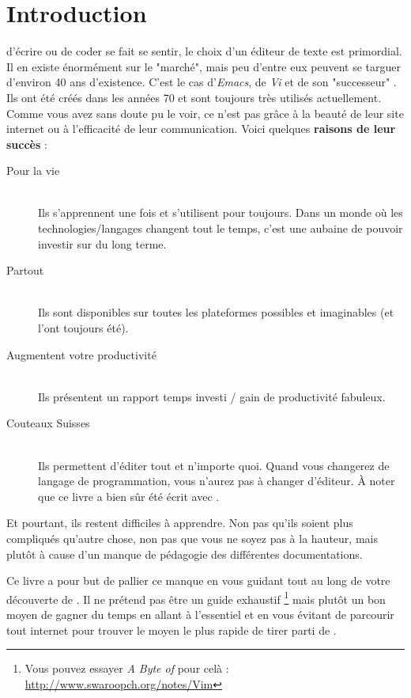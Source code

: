 \chapter*{Introduction}

 d'écrire ou de coder se fait se sentir, le choix d'un éditeur de texte est primordial. Il en existe énormément sur le "marché", mais peu d'entre eux peuvent se targuer d'environ 40 ans d'existence. C'est le cas d'\emph{Emacs}, de \emph{Vi} et de son "successeur" \vim{}. Ils ont été créés dans les années 70 et sont toujours très utilisés actuellement. Comme vous avez sans doute pu le voir, ce n'est pas grâce à la beauté de leur site internet ou à l'efficacité de leur communication. Voici quelques \textbf{raisons de leur succès} :

\begin{description}
    \item[Pour la vie] \hfill \\ Ils s'apprennent une fois et s'utilisent pour toujours. Dans un monde où les technologies/langages changent tout le temps, c'est une aubaine de pouvoir investir sur du long terme.
    \item[Partout] \hfill \\ Ils sont disponibles sur toutes les plateformes possibles et imaginables (et l'ont toujours été).
    \item[Augmentent votre productivité] \hfill \\ Ils présentent un rapport temps investi / gain de productivité fabuleux.
    \item[Couteaux Suisses] \hfill \\ Ils permettent d'éditer tout et n'importe quoi. Quand vous changerez de langage de programmation, vous n'aurez pas à changer d'éditeur. À noter que ce livre a bien sûr été écrit avec \vim.
\end{description}

Et pourtant, ils restent difficiles à apprendre. Non pas qu'ils soient plus compliqués qu'autre chose, non pas que vous ne soyez pas à la hauteur, mais plutôt à cause d'un manque de pédagogie des différentes documentations.

Ce livre a pour but de pallier ce manque en vous guidant tout au long de votre découverte de \vim{}. Il ne prétend pas être un guide exhaustif \footnote{Vous pouvez essayer \emph{A Byte of \vim} pour celà : \url{http://www.swaroopch.org/notes/Vim}} mais plutôt un bon moyen de gagner du temps en allant à l'essentiel et en vous évitant de parcourir tout internet pour trouver le moyen le plus rapide de tirer parti de \vim.

